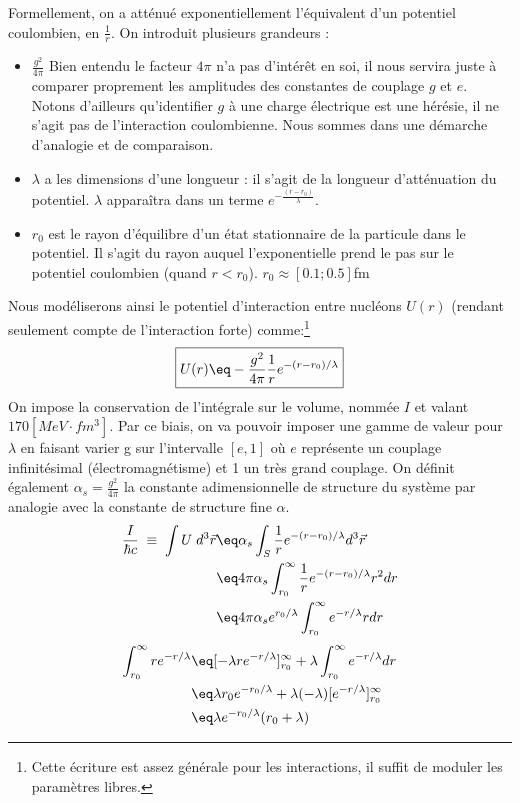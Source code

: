 Formellement, on a atténué exponentiellement l'équivalent d'un potentiel coulombien, en $\frac{1}{r}$. On introduit plusieurs grandeurs :
\begin{itemize}[label = $\bullet$]
    \item $\frac{g^2}{4\pi}$ Bien entendu le facteur $4\pi$ n'a pas d'intérêt en soi, il nous servira juste à comparer proprement les amplitudes des constantes de couplage $g$ et $e$. Notons d'ailleurs qu'identifier $g$ à une charge électrique est une hérésie, il ne s'agit pas de l'interaction coulombienne. Nous sommes dans une démarche d'analogie et de comparaison.
    \item $\lambda$ a les dimensions d'une longueur : il s'agit de la longueur d'atténuation du potentiel. $\lambda$ apparaîtra dans un terme $e^{-\frac{(r-r_0)}{\lambda}}$.
    \item $r_0$ est le rayon d'équilibre d'un état stationnaire de la particule dans le potentiel. Il s'agit du rayon auquel l'exponentielle prend le pas sur le potentiel coulombien (quand $r<r_0$). $r_0 \approx [0.1;0.5]$fm
\end{itemize}
Nous modéliserons ainsi le potentiel d'interaction entre nucléons $U(r)$ (rendant seulement compte de l'interaction forte) comme:\footnote{Cette écriture est assez générale pour les interactions, il suffit de moduler les paramètres libres.}
\begin{equation*}
\boxed{
    U(r) \eq -\frac{g^2}{4\pi} \frac{1}{r}e^{-(r-r_0)/\lambda}
    }
\end{equation*}
On impose la conservation de l'intégrale sur le volume, nommée $I$ et valant $170 [MeV \cdot fm^3]$. Par ce biais, on va pouvoir imposer une gamme de valeur pour $\lambda$ en faisant varier g sur l'intervalle $[e,1]$ où $e$ représente un couplage infinitésimal (électromagnétisme) et 1 un très grand couplage. On définit également $\alpha_s = \frac{g^2}{4\pi}$ la constante adimensionnelle de structure du système par analogie avec la constante de structure fine $\alpha$.
\begin{align*}
    \dfrac{I}{\hbar c}  
    \;\equiv\; \int U \; d^3\Vec{r}
    &\eq \alpha_s \int_S \frac{1}{r}e^{-(r-r_0)/\lambda} d^3\Vec{r}\\
    &\eq 4\pi \alpha_s \int_{r_0}^\infty \frac{1}{r}e^{-(r-r_0)/\lambda} r^2 dr\\
    &\eq 4\pi\alpha_s e^{r_0/\lambda} \int_{r_0}^\infty e^{-r/\lambda} r dr
\end{align*}
\begin{align*}
    \int_{r_0}^\infty re^{-r/\lambda} &\eq [-\lambda r e^{-r/\lambda}]_{r_0}^\infty + \lambda\int_{r_0}^\infty e^{-r/\lambda}dr\\
    &\eq \lambda r_0 e^{-r_0/\lambda} + \lambda (-\lambda)[e^{-r/\lambda}]_{r_0}^\infty\\
    &\eq \lambda e^{-r_0/\lambda}(r_0 + \lambda)
\end{align*}
